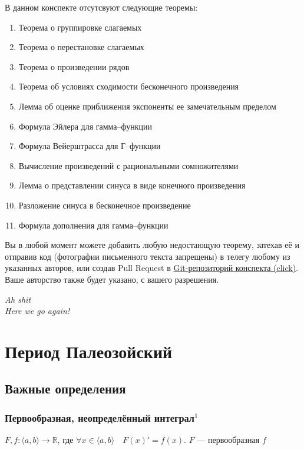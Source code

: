 \documentclass{article}
\begin{document}
В данном конспекте отсутсвуют следующие теоремы:
\begin{enumerate}
\item Теорема о группировке слагаемых
\item Теорема о перестановке слагаемых
\item Теорема о произведении рядов
\item Теорема об условиях сходимости бесконечного произведения
\item Лемма об оценке приближения экспоненты ее замечательным пределом
\item Формула Эйлера для гамма--функции
\item Формула Вейерштрасса для Г--функции
\item Вычисление произведений с рациональными сомножителями
\item Лемма о представлении синуса в виде конечного произведения
\item Разложение синуса в бесконечное произведение
\item Формула дополнения для гамма--функции
\end{enumerate}



Вы в любой момент можете добавить любую недостающую теорему, затехав её и отправив код (фотографии письменного текста запрещены) в телегу любому из указанных авторов, или создав Pull Request в \href{https://github.com/snitron/ct-itmo}{Git-репозиторий конспекта (click)}. Ваше авторство также будет указано, с вашего разрешения.
\newpage

\begin{flushright}
\emph{Ah shit\\
Here we go again!}
\end{flushright}

\tableofcontents


\setlength{\parskip}{6pt}%
\newpage
{}


\section{Период Палеозойский}
\subsection{Важные определения}
\subsubsection{Первообразная, неопределённый интеграл\texorpdfstring{$^1$}{}}
$F, f: \langle a, b \rangle \rightarrow \mathbb{R}$, где $\forall x \in \langle a, b \rangle \quad F(x)' = f(x)$. $F$ --- первообразная $f$
\end{document}
